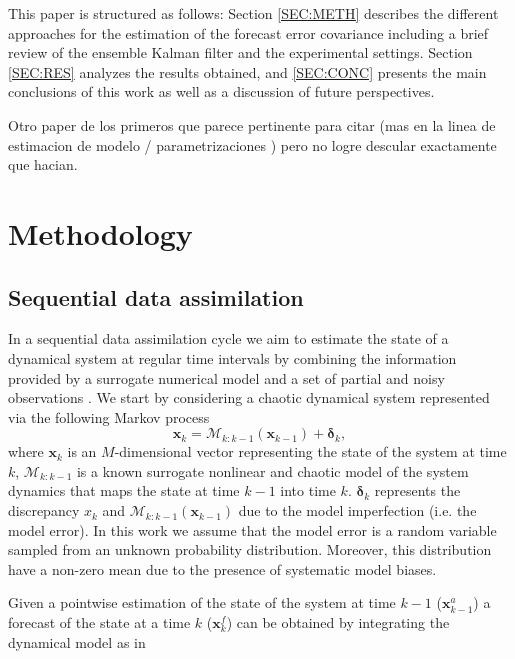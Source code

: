 \documentclass[num-refs]{wiley-article}
\renewcommand{\v}[1]{\ensuremath{\mathbf{#1}}}
\newcommand{\gv}[1]{\bm{#1}}
\begin{document}
This paper is structured as follows: Section \ref{SEC:METH} describes the different approaches for the estimation of the forecast error covariance including a brief review of the ensemble Kalman filter and the experimental settings. Section \ref{SEC:RES} analyzes the results obtained, and \ref{SEC:CONC} presents the main conclusions of this work as well as a discussion of future perspectives.

Otro paper de los primeros que parece pertinente para citar (mas en la linea de estimacion de modelo / parametrizaciones ) pero no logre descular exactamente que hacian. 


\section{Methodology}


\subsection{Sequential data assimilation}

In a sequential data assimilation cycle we aim to estimate the state of a dynamical system at regular time intervals by combining the information provided by a surrogate numerical model and a set of partial and noisy observations \citep{carrassi2018}.
We start by considering a chaotic dynamical system represented via the following Markov process
\begin{equation}
\label{EQU:sdm1}
\v x_{k} = \mathcal{M}_{k:k-1}(\v x_{k-1})+\gv \delta_k,
\end{equation}
where $\v x_{k}$ is an $M$-dimensional vector representing the state of the system at time $k$, $\mathcal{M}_{k:k-1}$ is a known surrogate nonlinear and chaotic model of the system dynamics that maps the state at time $k-1$ into time $k$. $\gv\delta_k$ represents the discrepancy $x_{k}$ and $\mathcal{M}_{k:k-1}(\v x_{k-1})$ due to the model imperfection (i.e. the model error). In this work we assume that the model error is a random variable sampled from an unknown probability distribution. Moreover, this distribution have a non-zero mean due to the presence of systematic model biases.   

Given a pointwise estimation of the state of the system at time $k-1$ ($\v x^a_{k-1}$) a forecast of the state at a time $k$ ($\v x^{f}_{k}$) can be obtained by integrating the dynamical model as in
\end{document}
